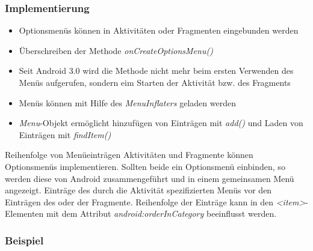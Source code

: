 \begin{frame}
   \frametitle{Implementierung}
   \begin{itemize}
      \item Optionsmenüs können in Aktivitäten oder Fragmenten eingebunden werden
      \item Überschreiben der Methode \emph{onCreateOptionsMenu()}
      \item Seit Android 3.0 wird die Methode nicht mehr beim ersten 
         Verwenden des Menüs aufgerufen, sondern eim Starten der Aktivität bzw. des Fragments
      \item Menüs können mit Hilfe des \emph{MenuInflaters} geladen werden
      \item \emph{Menu}-Objekt ermöglicht hinzufügen von Einträgen 
         mit \emph{add()} und Laden von Einträgen mit \emph{findItem()}
   \end{itemize}

   \begin{alertblock}{Reihenfolge von Menüeinträgen}
      Aktivitäten und Fragmente können Optionsmenüs implementieren.
      Sollten beide ein Optionsmenü einbinden, so werden 
      diese von Android zusammengeführt und in einem gemeinsamen Menü angezeigt. 
      Einträge des durch die Aktivität spezifizierten Menüs vor den Einträgen 
      des oder der Fragmente. Reihenfolge der Einträge kann in den 
      \emph{\textless{}item\textgreater}-Elementen mit dem Attribut 
      \emph{android:orderInCategory} beeinflusst werden.
   \end{alertblock}
\end{frame}

\begin{frame}
   \frametitle{Beispiel}
   
\end{frame}

